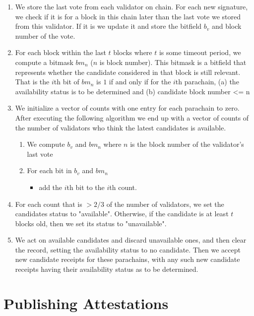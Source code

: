 \begin{enumerate}
\item We store the last vote from each validator on chain. For each new signature, we check if it is for a block in this chain later than the last vote we stored from this validator. If it is we update it and store the bitfield $b_v$ and block number of the vote.

\item For each block within the last $t$ blocks where $t$ is some timeout period, we compute a bitmask $bm_n$ ($n$ is block number). This bitmask is a bitfield that represents whether the candidate considered in that block is still relevant. That is the $i$th bit of $bm_n$ is $1$ if and only if for the $i$th parachain, 
    (a) the availability status is to be determined and
    (b) candidate block number <= n  
    
\item We initialize a vector of counts with one entry for each parachain to zero. After executing the following algorithm we end up with a vector of counts  of the number of validators who think the latest candidates is available. 
	\begin{enumerate}
    \item We compute 
    $b_v$ and $bm_n$ 
    where $n$ is the block number of the validator's last vote
   \item For each bit in $b_v$ and $bm_n$
		\begin{itemize}
        \item add the $i$th bit to the $i$th count.
        \end{itemize}
	\end{enumerate}
		
\item For each count that is $>2/3$ of the number of validators, we set the candidates status to "available". Otherwise, if the candidate is at least $t$ blocks old, then we set its status to "unavailable".

\item We act on available candidates and discard unavailable ones, and then clear the record, setting the availability status to no candidate. Then we accept new candidate receipts for these parachains, with any such new candidate receipts having their availability status as to be determined.
\end{enumerate}

\section{Publishing Attestations}
\label{sect-publishing-attestations}
